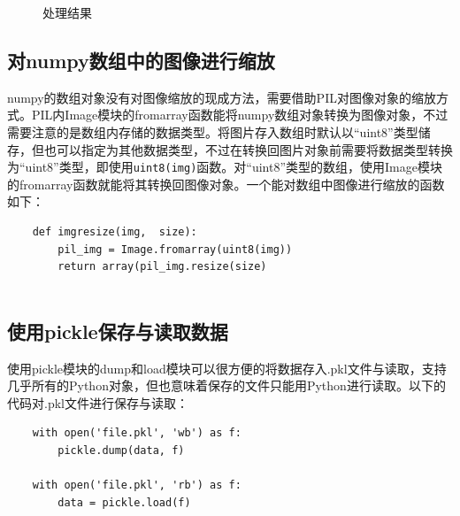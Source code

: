 \documentclass[fontset=ubuntu]{ctexart}
\begin{document}
\begin{figure}[htb]
    \centering
    \caption{处理结果}
    \label{outline_histogram}
\end{figure}

\subsection{对numpy数组中的图像进行缩放}
numpy的数组对象没有对图像缩放的现成方法，需要借助PIL对图像对象的缩放方式。PIL内Image模块的fromarray函数能将numpy数组对象转换为图像对象，不过需要注意的是数组内存储的数据类型。将图片存入数组时默认以“uint8”类型储存，但也可以指定为其他数据类型，不过在转换回图片对象前需要将数据类型转换为“uint8”类型，即使用\verb|uint8(img)|函数。对“uint8”类型的数组，使用Image模块的fromarray函数就能将其转换回图像对象。一个能对数组中图像进行缩放的函数如下：
\begin{listing}[htb]
    \begin{verbatim}
    def imgresize(img,  size):
        pil_img = Image.fromarray(uint8(img))
        return array(pil_img.resize(size)
            
    \end{verbatim}
\end{listing}

\subsection{使用pickle保存与读取数据}
使用pickle模块的dump和load模块可以很方便的将数据存入.pkl文件与读取，支持几乎所有的Python对象，但也意味着保存的文件只能用Python进行读取。以下的代码对.pkl文件进行保存与读取：
\begin{listing}[htb]
    \begin{verbatim}
    with open('file.pkl', 'wb') as f:
        pickle.dump(data, f)

    with open('file.pkl', 'rb') as f:
        data = pickle.load(f)
            
    \end{verbatim}
\end{listing}
\end{document}

